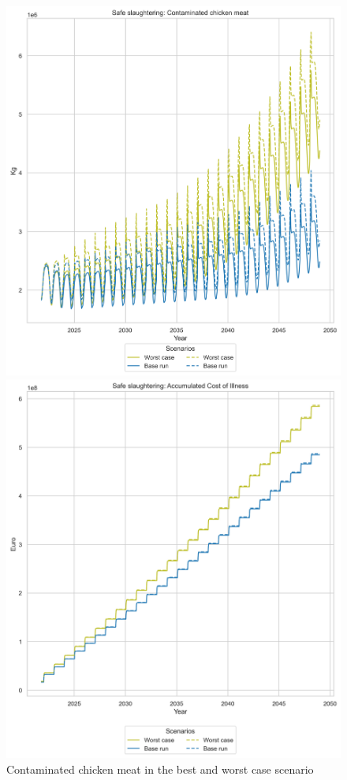 \begin{figure}[h!]
    \centering
    \begin{minipage}{0.45\textwidth}
        \centering
        \includegraphics[width=1\textwidth]{images/ss_Base and Worst Case_meat.png} 
        \caption{Contaminated chicken meat in the best and worst case scenario}
        \label{fig:ss_bwc_meat}
    \end{minipage}\hfill
    \begin{minipage}{0.45\textwidth}
        \centering
        \includegraphics[width=1\textwidth]{images/ss_Base and Worst Case_acoi.png}

\end{minipage}
\end{figure}
